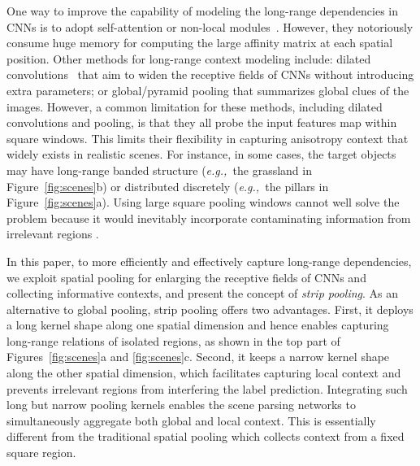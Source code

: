 \documentclass[final]{cvpr}
\def\eg{\emph{e.g.,~}}
\begin{document}
One way to improve the capability of modeling the long-range dependencies in CNNs is to adopt self-attention or non-local modules~\cite{wang2018non,huang2018ccnet,chen2016attention,ren2017end,hong2016learning,yang2014context,zhao2018psanet,zhang2020dynamic,zhang2019dual,li2019global}.
However, they notoriously consume huge memory for computing the large affinity matrix at each spatial position.
Other methods for long-range context modeling include:
dilated convolutions~\cite{chen2017deeplab,chen2018encoder,chen2017rethinking,yu2015multi} 
that aim to widen the receptive fields of CNNs
without introducing extra parameters;
or global/pyramid pooling \cite{lazebnik2006beyond,zhao2016pyramid,he2019adaptive,chen2017deeplab,chen2018encoder,yang2018denseaspp} that summarizes global clues of the images.
However, a common limitation for these 
methods, including dilated convolutions and pooling, 
is that they all probe the input features map within square windows.
This limits their flexibility in capturing anisotropy context that widely exists in realistic scenes. 
For instance, in some cases, the target objects
may have long-range banded structure (\eg the grassland in Figure~\ref{fig:scenes}b) or distributed discretely (\eg the pillars in Figure~\ref{fig:scenes}a).
Using large square pooling windows cannot well solve the problem because it would inevitably 
incorporate contaminating information from irrelevant regions \cite{he2019adaptive}.
 
 
In this paper, to more efficiently and effectively capture long-range dependencies, we exploit spatial pooling for enlarging the receptive fields of CNNs and collecting informative contexts, and present the concept 
of \emph{strip pooling}.
As an alternative to global pooling, strip pooling offers two advantages.
First, it deploys a long kernel shape along one spatial dimension and hence enables capturing long-range relations of isolated regions, as shown in the top part of Figures~\ref{fig:scenes}a and \ref{fig:scenes}c.
Second, it keeps a narrow kernel shape along 
the other spatial dimension, which facilitates capturing local context and prevents irrelevant regions from interfering the label prediction.
Integrating such long but narrow pooling kernels enables the scene parsing networks to  simultaneously aggregate both global and local context. 
This is essentially different from the traditional spatial pooling which collects context from a fixed square region.
\end{document}
